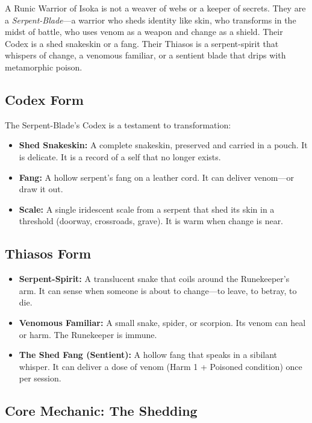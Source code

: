 A Runic Warrior of Isoka is not a weaver of webs or a keeper of secrets. They are a \textit{Serpent-Blade}—a warrior who sheds identity like skin, who transforms in the midst of battle, who uses venom as a weapon and change as a shield. Their Codex is a shed snakeskin or a fang. Their Thiasos is a serpent-spirit that whispers of change, a venomous familiar, or a sentient blade that drips with metamorphic poison.

\subsection{Codex Form}

The Serpent-Blade's Codex is a testament to transformation:

\begin{itemize}
\item \textbf{Shed Snakeskin:} A complete snakeskin, preserved and carried in a pouch. It is delicate. It is a record of a self that no longer exists.
\item \textbf{Fang:} A hollow serpent's fang on a leather cord. It can deliver venom—or draw it out.
\item \textbf{Scale:} A single iridescent scale from a serpent that shed its skin in a threshold (doorway, crossroads, grave). It is warm when change is near.
\end{itemize}

\subsection{Thiasos Form}

\begin{itemize}
\item \textbf{Serpent-Spirit:} A translucent snake that coils around the Runekeeper's arm. It can sense when someone is about to change—to leave, to betray, to die.
\item \textbf{Venomous Familiar:} A small snake, spider, or scorpion. Its venom can heal or harm. The Runekeeper is immune.
\item \textbf{The Shed Fang (Sentient):} A hollow fang that speaks in a sibilant whisper. It can deliver a dose of venom (Harm 1 + Poisoned condition) once per session.
\end{itemize}

\subsection{Core Mechanic: The Shedding}

